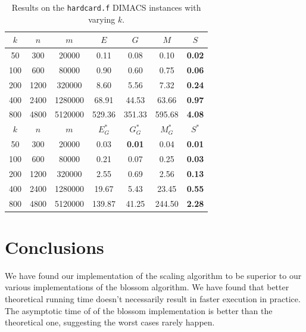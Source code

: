 \begin{table}
\centering
\begin{tabular}{ccc|cccc}
$k$ & $n$ & $m$ & $E$ & $G$ & $M$ & $S$ \\
\hline
50 & 300 & 20000 & 0.11 & 0.08 & 0.10 & \textbf{0.02} \\
100 & 600 & 80000 & 0.90 & 0.60 & 0.75 & \textbf{0.06} \\
200 & 1200 & 320000 & 8.60 & 5.56 & 7.32 & \textbf{0.24} \\
400 & 2400 & 1280000 & 68.91 & 44.53 & 63.66 & \textbf{0.97} \\
800 & 4800 & 5120000 & 529.36 & 351.33 & 595.68 & \textbf{4.08} \\
\hline
$k$ & $n$ & $m$ & $E^*_G$ & $G^*_G$ & $M^*_G$ & $S^*$ \\
\hline
50 & 300 & 20000 & 0.03 & \textbf{0.01} & 0.04 & \textbf{0.01} \\
100 & 600 & 80000 & 0.21 & 0.07 & 0.25 & \textbf{0.03} \\
200 & 1200 & 320000 & 2.55 & 0.69 & 2.56 & \textbf{0.13} \\
400 & 2400 & 1280000 & 19.67 & 5.43 & 23.45 & \textbf{0.55} \\
800 & 4800 & 5120000 & 139.87 & 41.25 & 244.50 & \textbf{2.28} \\
\end{tabular}
\caption{Results on the \texttt{hardcard.f} DIMACS instances with varying $k$.}\label{tab:hardcard}
\end{table}

\section{Conclusions}

We have found our implementation of the scaling algorithm to be superior to our various implementations of the blossom algorithm.  We have found that better theoretical running time doesn't necessarily result in faster execution in practice. The asymptotic time of of the blossom implementation is better than the theoretical one, suggesting the worst cases rarely happen. 

